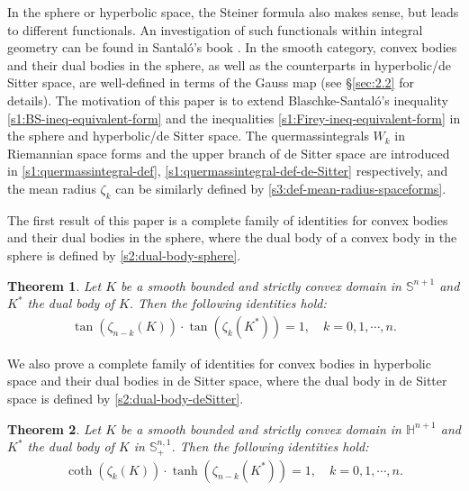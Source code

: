\documentclass[11pt,reqno]{amsart}
\newtheorem{thm}{Theorem}[section]
\theoremstyle{definition}
\theoremstyle{remark}
\numberwithin{equation}{section}
\renewcommand{\(}{\left(}
\renewcommand{\)}{\right)}
\renewcommand{\~}{\tilde}
\renewcommand{\-}{\overline}
\begin{document}
In the sphere or hyperbolic space, the Steiner formula also makes sense, but leads to different functionals. An investigation of such functionals within integral geometry can be found in Santal\'o's book \cite{Sant2004}. In the smooth category, convex bodies and their dual bodies in the sphere, as well as the counterparts in hyperbolic/de Sitter space, are well-defined in terms of the Gauss map (see \S \ref{sec:2.2} for details). The motivation of this paper is to extend Blaschke-Santal\'o's inequality \eqref{s1:BS-ineq-equivalent-form} and the inequalities \eqref{s1:Firey-ineq-equivalent-form} in the sphere and hyperbolic/de Sitter space. The quermassintegrals $W_k$ in Riemannian space forms and the upper branch of de Sitter space are introduced in \eqref{s1:quermassintegral-def}, \eqref{s1:quermassintegral-def-de-Sitter} respectively, and the mean radius $\zeta_k$ can be similarly defined by \eqref{s3:def-mean-radius-spaceforms}.

The first result of this paper is a complete family of identities for convex bodies and their dual bodies in the sphere, where the dual body of a convex body in the sphere is defined by \eqref{s2:dual-body-sphere}.
\begin{thm}\label{thm-sphere}
	Let $K$ be a smooth bounded and strictly convex domain in $\mathbb S^{n+1}$ and $K^\ast$ the dual body of $K$. Then the following identities hold:
	\begin{align}\label{s1:identity-sphere}
	\tan\(\zeta_{n-k}(K)\)\cdot \tan\(\zeta_{k}(K^\ast)\)=1, \quad k=0,1,\cdots,n.
	\end{align}	
\end{thm}

We also prove a complete family of identities for convex bodies in hyperbolic space and their dual bodies in de Sitter space, where the dual body in de Sitter space is defined by \eqref{s2:dual-body-deSitter}.
\begin{thm}\label{thm-hyperbolic}
	Let $K$ be a smooth bounded and strictly convex domain in $\mathbb H^{n+1}$ and $K^\ast$ the dual body of $K$ in $\mathbb S^{n,1}_{+}$. Then the following identities hold:
	\begin{align}\label{s1:identity-hyperbolic}
	\coth(\zeta_{k}(K)) \cdot \tanh(\zeta_{n-k}(K^\ast))=1, \quad k=0,1,\cdots,n.
	\end{align}	
\end{thm}
\end{document}
